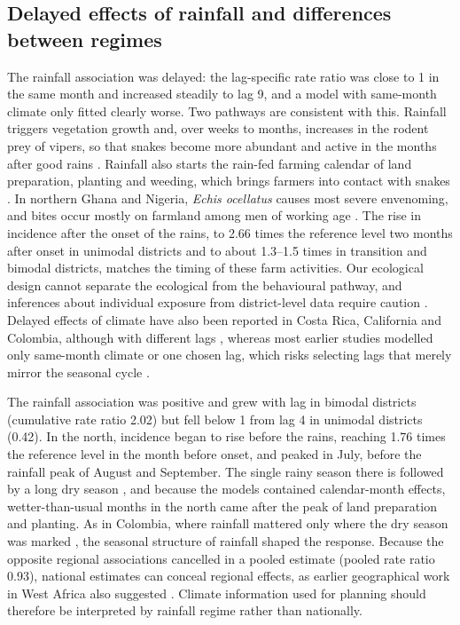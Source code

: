 \documentclass[11pt,a4paper]{article}
\begin{document}
\subsection{Delayed effects of rainfall and differences between regimes}

The rainfall association was delayed: the lag-specific rate ratio was close to 1 in the same month and increased steadily to lag 9, and a model with same-month climate only fitted clearly worse. Two pathways are consistent with this. Rainfall triggers vegetation growth and, over weeks to months, increases in the rodent prey of vipers, so that snakes become more abundant and active in the months after good rains \cite{ref7,ref61}. Rainfall also starts the rain-fed farming calendar of land preparation, planting and weeding, which brings farmers into contact with snakes \cite{ref5,ref6,ref60}. In northern Ghana and Nigeria, \emph{Echis ocellatus} causes most severe envenoming, and bites occur mostly on farmland among men of working age \cite{ref6,ref62,ref63}. The rise in incidence after the onset of the rains, to 2.66 times the reference level two months after onset in unimodal districts and to about 1.3--1.5 times in transition and bimodal districts, matches the timing of these farm activities. Our ecological design cannot separate the ecological from the behavioural pathway, and inferences about individual exposure from district-level data require caution \cite{ref64}. Delayed effects of climate have also been reported in Costa Rica, California and Colombia, although with different lags \cite{ref9,ref10,ref11}, whereas most earlier studies modelled only same-month climate or one chosen lag, which risks selecting lags that merely mirror the seasonal cycle \cite{ref8,ref36}.

The rainfall association was positive and grew with lag in bimodal districts (cumulative rate ratio 2.02) but fell below 1 from lag 4 in unimodal districts (0.42). In the north, incidence began to rise before the rains, reaching 1.76 times the reference level in the month before onset, and peaked in July, before the rainfall peak of August and September. The single rainy season there is followed by a long dry season \cite{ref14}, and because the models contained calendar-month effects, wetter-than-usual months in the north came after the peak of land preparation and planting. As in Colombia, where rainfall mattered only where the dry season was marked \cite{ref11}, the seasonal structure of rainfall shaped the response. Because the opposite regional associations cancelled in a pooled estimate (pooled rate ratio 0.93), national estimates can conceal regional effects, as earlier geographical work in West Africa also suggested \cite{ref57}. Climate information used for planning should therefore be interpreted by rainfall regime rather than nationally.
\end{document}
